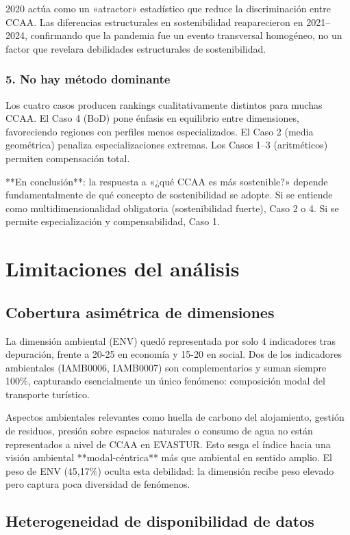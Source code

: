 2020 actúa como un «atractor» estadístico que reduce la discriminación entre CCAA. Las diferencias estructurales en sostenibilidad reaparecieron en 2021--2024, confirmando que la pandemia fue un evento transversal homogéneo, no un factor que revelara debilidades estructurales de sostenibilidad.

\subsubsection{5. No hay método dominante}

Los cuatro casos producen rankings cualitativamente distintos para muchas CCAA. El Caso 4 (BoD) pone énfasis en equilibrio entre dimensiones, favoreciendo regiones con perfiles menos especializados. El Caso 2 (media geométrica) penaliza especializaciones extremas. Los Casos 1--3 (aritméticos) permiten compensación total.

**En conclusión**: la respuesta a «¿qué CCAA es más sostenible?» depende fundamentalmente de qué concepto de sostenibilidad se adopte. Si se entiende como multidimensionalidad obligatoria (sostenibilidad fuerte), Caso 2 o 4. Si se permite especialización y compensabilidad, Caso 1.

\section{Limitaciones del análisis}

\subsection{Cobertura asimétrica de dimensiones}

La dimensión ambiental (ENV) quedó representada por solo 4 indicadores tras depuración, frente a 20-25 en economía y 15-20 en social. Dos de los indicadores ambientales (IAMB0006, IAMB0007) son complementarios y suman siempre 100\%, capturando esencialmente un único fenómeno: composición modal del transporte turístico.

Aspectos ambientales relevantes como huella de carbono del alojamiento, gestión de residuos, presión sobre espacios naturales o consumo de agua no están representados a nivel de CCAA en EVASTUR. Esto sesga el índice hacia una visión ambiental **modal-céntrica** más que ambiental en sentido amplio. El peso de ENV (45,17\%) oculta esta debilidad: la dimensión recibe peso elevado pero captura poca diversidad de fenómenos.

\subsection{Heterogeneidad de disponibilidad de datos}

